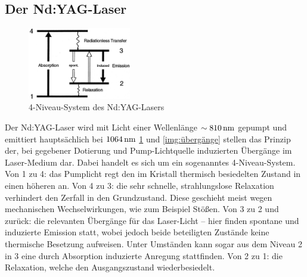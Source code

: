 \documentclass[numbers=noenddot,12pt,a4paper]{scrartcl}
\begin{document}
\subsection{Der Nd:YAG-Laser}\label{subsec:ndyag}
\begin{figure}
	\centering
	\includegraphics[width=0.4\textwidth]{vierniveau.png}
	\caption{4-Niveau-System des Nd:YAG-Lasers}\label{img:4niv}
\end{figure}
Der Nd:YAG-Laser wird mit Licht einer Wellenlänge $\sim\unit[810]{nm}$ gepumpt und emittiert hauptsächlich bei $\unit[1064]{nm}$ \ref{img:4niv} und \ref{img:übergänge} stellen das Prinzip der, bei gegebener Dotierung und Pump-Lichtquelle induzierten Übergänge im Laser-Medium dar. Dabei handelt es sich um ein sogenanntes 4-Niveau-System. \\
Von 1 zu 4: das Pumplicht regt den im Kristall thermisch besiedelten Zustand in einen höheren an. Von 4 zu 3: die sehr schnelle, strahlungslose Relaxation verhindert den Zerfall in den Grundzustand. Diese geschieht meist wegen mechanischen Wechselwirkungen, wie zum Beispiel Stößen. Von 3 zu 2 und zurück: die relevanten Übergänge für das Laser-Licht -- hier finden spontane und induzierte Emission statt, wobei jedoch beide beteiligten Zustände keine thermische Besetzung aufweisen. Unter Umständen kann sogar aus dem Niveau 2 in 3 eine durch Absorption induzierte Anregung stattfinden. Von 2 zu 1: die Relaxation, welche den Ausgangszustand wiederbesiedelt.
\pagebreak
\end{document}
